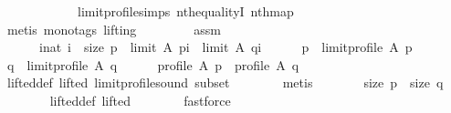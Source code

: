 \begin{isabellebody}
\ \ \ \ \ \ \ \ \ \ \ \ limit{\isacharunderscore}{\kern0pt}profile{\isachardot}{\kern0pt}simps\ nth{\isacharunderscore}{\kern0pt}equalityI\ nth{\isacharunderscore}{\kern0pt}map\isanewline
\ \ \ \ \ \ \isamarkupfalse%
\ {\isacharparenleft}{\kern0pt}metis\ {\isacharparenleft}{\kern0pt}mono{\isacharunderscore}{\kern0pt}tags{\isacharcomma}{\kern0pt}\ lifting{\isacharparenright}{\kern0pt}{\isacharparenright}{\kern0pt}\isanewline
\ \ \isamarkupfalse%
\isanewline
\ \ \ \ \isamarkupfalse%
\ assm{\isacharcolon}{\kern0pt}\isanewline
\ \ \ \ \ \ {\isachardoublequoteopen}{\isasymnot}{\isacharparenleft}{\kern0pt}{\isasymforall}i{\isacharcolon}{\kern0pt}{\isacharcolon}{\kern0pt}nat{\isachardot}{\kern0pt}\ i\ {\isacharless}{\kern0pt}\ size\ p\ {\isasymlongrightarrow}\ {\isacharparenleft}{\kern0pt}limit\ A\ {\isacharparenleft}{\kern0pt}p{\isacharbang}{\kern0pt}i{\isacharparenright}{\kern0pt}{\isacharparenright}{\kern0pt}\ {\isacharequal}{\kern0pt}\ {\isacharparenleft}{\kern0pt}limit\ A\ {\isacharparenleft}{\kern0pt}q{\isacharbang}{\kern0pt}i{\isacharparenright}{\kern0pt}{\isacharparenright}{\kern0pt}{\isacharparenright}{\kern0pt}{\isachardoublequoteclose}\isanewline
\ \ \ \ \isamarkupfalse%
\ {\isacharquery}{\kern0pt}p\ {\isacharequal}{\kern0pt}\ {\isachardoublequoteopen}limit{\isacharunderscore}{\kern0pt}profile\ A\ p{\isachardoublequoteclose}\isanewline
\ \ \ \ \isamarkupfalse%
\ {\isacharquery}{\kern0pt}q\ {\isacharequal}{\kern0pt}\ {\isachardoublequoteopen}limit{\isacharunderscore}{\kern0pt}profile\ A\ q{\isachardoublequoteclose}\isanewline
\ \ \ \ \isamarkupfalse%
\ {\isachardoublequoteopen}profile\ A\ {\isacharquery}{\kern0pt}p\ {\isasymand}\ profile\ A\ {\isacharquery}{\kern0pt}q{\isachardoublequoteclose}\isanewline
\ \ \ \ \ \ \isamarkupfalse%
\ lifted{\isacharunderscore}{\kern0pt}def\ lifted\ limit{\isacharunderscore}{\kern0pt}profile{\isacharunderscore}{\kern0pt}sound\ subset\isanewline
\ \ \ \ \ \ \isamarkupfalse%
\ metis\isanewline
\ \ \ \ \isamarkupfalse%
\ \isamarkupfalse%
\ {\isachardoublequoteopen}size\ {\isacharquery}{\kern0pt}p\ {\isacharequal}{\kern0pt}\ size\ {\isacharquery}{\kern0pt}q{\isachardoublequoteclose}\isanewline
\ \ \ \ \ \ \isamarkupfalse%
\ lifted{\isacharunderscore}{\kern0pt}def\ lifted\isanewline
\ \ \ \ \ \ \isamarkupfalse%
\ fastforce\isanewline
\ \ \ \ \isamarkupfalse%
\ \isamarkupfalse%
\isanewline

\end{isabellebody}
